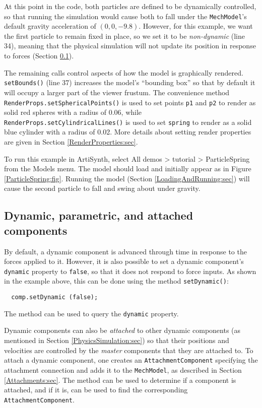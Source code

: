 At this point in the code, both particles are defined to be
dynamically controlled, so that running the simulation would cause
both to fall under the {\tt MechModel}'s default gravity acceleration
of $(0, 0, -9.8)$. However, for this example, we want the first
particle to remain fixed in place, so we set it to be {\it
non-dynamic} (line 34), meaning that the physical simulation will not
update its position in response to forces (Section
\ref{DynamicVsParametric:sec}).

The remaining calls control aspects of how the model is graphically
rendered.  {\tt setBounds()} (line 37) increases the model's
``bounding box'' so that by default it will occupy a larger part of
the viewer frustum. The convenience method {\tt
RenderProps.setSphericalPoints()} is used to set points {\tt p1} and
{\tt p2} to render as solid red spheres with a radius of 0.06, while
{\tt RenderProps.setCylindricalLines()} is used to set {\tt spring} to
render as a solid blue cylinder with a radius of 0.02. More details
about setting render properties are given in Section
\ref{RenderProperties:sec}.

To run this example in ArtiSynth, select {\sf All demos > tutorial >
ParticleSpring} from the {\sf Models} menu. The model should load and
initially appear as in Figure \ref{ParticleSpring:fig}.  Running
the model (Section \ref{LoadingAndRunning:sec}) will
cause the second particle to fall and swing about under gravity.

\subsection{Dynamic, parametric, and attached components}
\label{DynamicVsParametric:sec}

By default, a dynamic component is advanced through time in response
to the forces applied to it. However, it is also possible to set a
dynamic component's {\tt dynamic} property to {\tt false}, so that it
does not respond to force inputs.  As shown in the example above, this
can be done using the method
{\tt setDynamic()}:
%
\begin{verbatim}
  comp.setDynamic (false);
\end{verbatim}
%
The method
can be used to query the {\tt dynamic} property.

Dynamic components can also be {\it attached} to other dynamic
components (as mentioned in Section \ref{PhysicsSimulation:sec}) so
that their positions and velocities are controlled by the {\it master}
components that they are attached to.  To attach a dynamic component,
one creates an {\tt AttachmentComponent} specifying the attachment
connection and adds it to the {\tt MechModel}, as described in Section
\ref{Attachments:sec}.  The method
can be used to determine if a component is attached, and if it is,
can be used to find the corresponding {\tt AttachmentComponent}.

